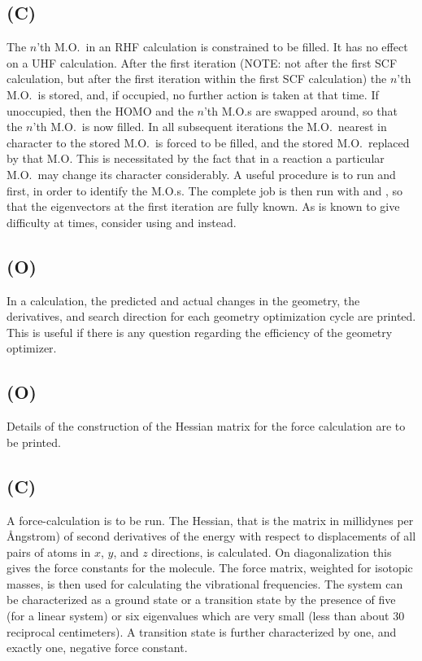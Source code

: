 \subsection*{ (C)}
The $n$'th M.O.\  in an RHF calculation is constrained  to  be  filled.
It  has no effect on a UHF calculation.  After the first iteration (NOTE:
not after the first SCF calculation, but after the first iteration
within the first SCF calculation) the $n$'th M.O.\ is stored, and, if
occupied, no further action is taken at that time.  If unoccupied, then
the  HOMO  and the $n$'th M.O.s are swapped around, so that the $n$'th
M.O.\ is now filled.  In all subsequent iterations the M.O.\ nearest in
character to the stored M.O.\  is forced to be filled, and the stored
M.O.\ replaced by that M.O.  This is necessitated by the fact that in
a  reaction  a  particular M.O.\ may change its character
considerably.  A useful procedure is to run  and
 first, in order to identify the M.O.s. The  complete
job  is then  run  with  and , so that the
eigenvectors at the first iteration are fully known.  As  is
known to give difficulty at times, consider using 
and  instead.



\subsection*{ (O)}
In a  calculation, the
predicted and actual changes in the geometry,  the  derivatives,
and  search  direction  for each geometry optimization cycle are printed.
This is useful if there is any question regarding the efficiency  of  the
 geometry optimizer.


\subsection*{ (O)}
Details of the construction of the  Hessian  matrix  for  the  force
calculation are to be printed.

\subsection*{ (C)}
A force-calculation is to be run.  The Hessian, that is  the  matrix
in  millidynes  per  \AA ngstrom)  of second derivatives of the energy with
respect to displacements of all pairs of atoms in $x$, $y$, and $z$ directions,
is calculated.  On diagonalization this gives the force constants for the
molecule.  The force matrix, weighted for isotopic masses, is  then  used
for   calculating   the  vibrational  frequencies.   The  system  can  be
characterized as a ground state or a transition state by the presence  of
five  (for a linear system) or six eigenvalues which are very small (less
than about 30 reciprocal centimeters).  A  transition  state  is  further
characterized by one, and exactly one, negative force constant.

